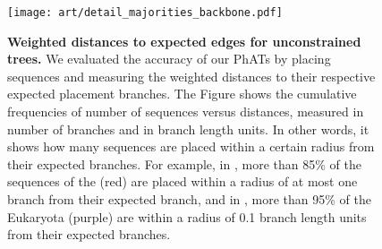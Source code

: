 
\begin{figure}[hpbt]
    \centering
    \texttt{[image: art/detail\_majorities\_backbone.pdf]}
    \begin{subfigure}{0pt}
        \label{fig:detail_majorities_backbone:sub:num_br}
    \end{subfigure}
    \begin{subfigure}{0pt}
        \label{fig:detail_majorities_backbone:sub:br_dist}
    \end{subfigure}
    \caption[Weighted distances to expected edges for unconstrained trees]{
        \textbf{Weighted distances to expected edges for unconstrained trees.}
        We evaluated the accuracy of our \acp{PhAT} by placing sequences
        and measuring the weighted distances to their respective expected placement branches.
        The Figure shows the cumulative frequencies of number of sequences versus distances,
        measured  in number of branches
        and  in branch length units.
        In other words, it shows how many sequences are placed
        within a certain radius from their expected branches.
        For example, in ,
        more than 85\% of the sequences of the  (red) are placed
        within a radius of at most one branch from their expected branch,
        and in , more than 95\% of the Eukaryota (purple) are
        within a radius of 0.1 branch length units from their expected branches.
    }
    \label{fig:detail_majorities_backbone}
\end{figure}


